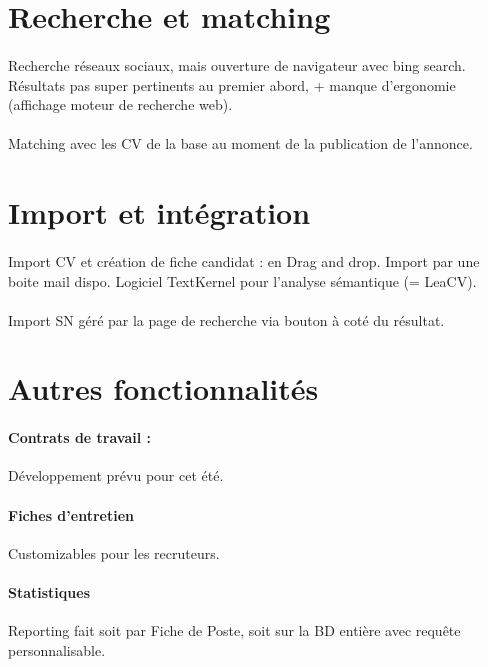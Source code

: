 \documentclass[12pt,twoside]{scrreprt}
\begin{document}
\section{Recherche et matching}
\paragraph{} Recherche réseaux sociaux, mais ouverture de navigateur avec bing search. Résultats pas super pertinents au premier abord, + manque d'ergonomie (affichage moteur de recherche web).
\paragraph{} Matching avec les CV de la base au moment de la publication de l'annonce.



\section{Import et intégration}
\paragraph{} Import CV et création de fiche candidat : en Drag and drop. Import par une boite mail dispo. Logiciel TextKernel pour l'analyse sémantique (= LeaCV). 
\paragraph{} Import SN géré par la page de recherche via bouton à coté du résultat.


\section{Autres fonctionnalités} 
\paragraph{Contrats de travail :} Développement prévu pour cet été.
\paragraph{Fiches d'entretien}  Customizables pour les recruteurs.
\paragraph{Statistiques} Reporting fait soit par Fiche de Poste, soit sur la BD entière avec requête personnalisable.
\end{document}
